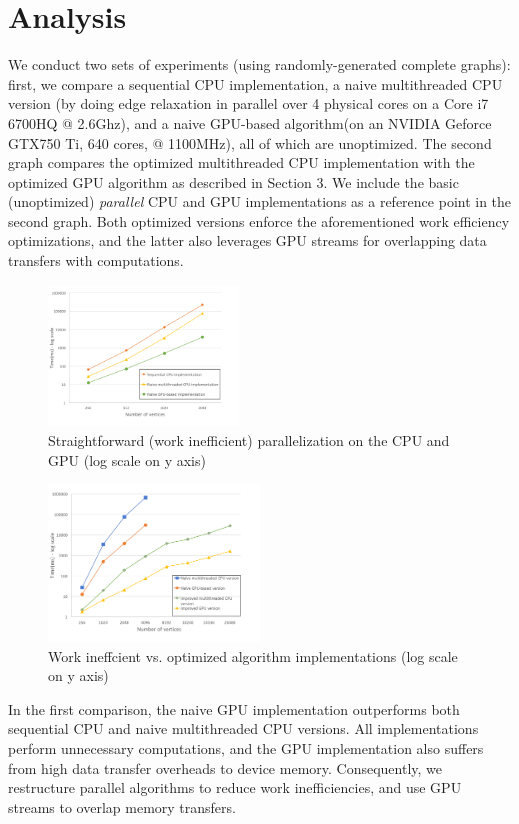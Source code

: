 \documentclass[twocolumn]{article}
\begin{document}
\section{Analysis}
We conduct two sets of experiments (using randomly-generated complete graphs): first, we compare a
sequential CPU implementation, a naive multithreaded CPU version (by doing edge relaxation in parallel over 4 physical cores on a Core i7 6700HQ @ 2.6Ghz), and a naive GPU-based algorithm(on an NVIDIA Geforce GTX750 Ti, 640 cores, @ 1100MHz), all of which are unoptimized. The second graph compares the optimized multithreaded CPU implementation with the optimized GPU algorithm as described in Section 3. We include the basic (unoptimized) \textit{parallel} CPU and GPU implementations as a reference point in the second graph. Both optimized versions enforce the aforementioned work efficiency optimizations, and the latter also leverages GPU streams for overlapping data transfers with computations.\newline
\begin{figure}[h]

\centering
\includegraphics[width=0.45\textwidth]{fig1}
\caption{Straightforward (work inefficient) parallelization on the CPU and GPU (log scale on y axis)}
\end{figure}


\begin{figure}[h]

\centering
\includegraphics[width=0.5\textwidth]{fig2}
\caption{Work ineffcient vs. optimized algorithm implementations (log scale on y axis)}
\label{ab}
\end{figure}
In the first comparison, the naive GPU implementation outperforms both sequential CPU and naive multithreaded CPU versions. All implementations perform unnecessary computations, and the GPU implementation also suffers from high data transfer overheads to device memory. Consequently, we restructure parallel algorithms to reduce work inefficiencies, and use GPU streams to overlap memory transfers.
\end{document}
